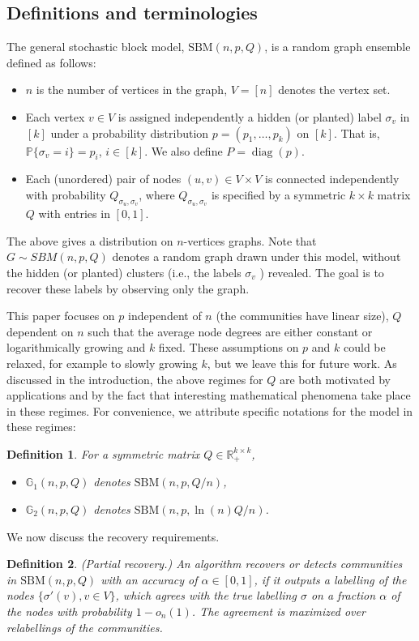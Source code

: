 \documentclass[11pt]{article}
\newcommand{\gss}{\mathbb{G}_1}
\newcommand{\gs}{\mathbb{G}_2}
\newcommand{\mR}{\mathbb{R}}
\newcommand{\pp}{\mathbb{P}}
\DeclareMathOperator{\diag}{diag}
\newcommand{\1}{\mathbb{1}}
\newtheorem{definition}{Definition}
\begin{document}
\subsection{Definitions and terminologies}\label{def-term}
The general stochastic block model, $\text{SBM}(n,p,Q)$, is a random graph ensemble defined as follows:
\begin{itemize}
\item $n$ is the number of vertices in the graph, $V=[n]$ denotes the vertex set.
\item Each vertex $v \in V$ is assigned independently a hidden (or planted) label $\sigma_v$ in $[k]$ under a probability distribution $p=(p_1,\dots,p_k)$ on $[k]$. That is, $\pp\{\sigma_v=i\}=p_i$, $i \in[k]$. We also define $P=\diag(p)$.
\item Each (unordered) pair of nodes $(u,v) \in V\times V$ is connected independently with probability $Q_{\sigma_u,\sigma_v}$, where $Q_{\sigma_u,\sigma_v}$ is specified by a symmetric $k \times k$ matrix $Q$ with entries in $[0,1]$.
\end{itemize}
The above gives a distribution on $n$-vertices graphs. 
Note that $G\sim SBM(n,p,Q)$ denotes a random graph drawn under this model, without the hidden (or planted) clusters (i.e., the labels $\sigma_v$ ) revealed. The goal is to recover these labels by observing only the graph. 

This paper focuses on $p$ independent of $n$ (the communities have linear size), $Q$ dependent on $n$ such that the average node degrees are either constant or logarithmically growing and $k$ fixed. These assumptions on $p$ and $k$ could be relaxed, for example to slowly growing $k$, but we leave this for future work. As discussed in the introduction, the above regimes for $Q$ are both motivated by applications and by the fact that interesting mathematical phenomena take place in these regimes. For convenience, we attribute specific notations for the model in these regimes:
\begin{definition}
For a symmetric matrix $Q \in \mR_+^{k \times k}$, 
\begin{itemize}
\item $\gss(n,p,Q)$ denotes $\text{SBM}(n,p,Q/n)$,
\item $\gs(n,p,Q)$ denotes $\text{SBM}(n,p,\ln(n)Q/n)$.
\end{itemize}
\end{definition}

We now discuss the recovery requirements. 
\begin{definition} (Partial recovery.) 
An algorithm recovers or detects communities in $\text{SBM}(n,p,Q)$ with an accuracy of $\alpha \in [0,1]$, if it outputs a labelling of the nodes $\{\sigma'(v), v \in V\}$, which agrees with the true labelling $\sigma$ on a fraction $\alpha$ of the nodes with probability $1-o_n(1)$. The agreement is maximized over relabellings of the communities.
\end{definition}
\end{document}
